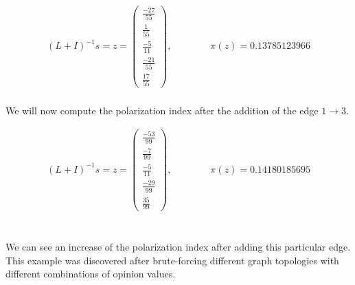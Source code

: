 \begin{equation}
	\begin{aligned}
		(L+I)^{-1}s=z=
		\left(\begin{matrix}
		\frac{-27}{55} \\
		\frac{1}{55} \\
		\frac{-5}{11} \\
		\frac{-21}{55} \\
		\frac{17}{55}
		\end{matrix}\right),
		\qquad \qquad
		\pi(z)= 0.13785123966
	\end{aligned}
\end{equation}
\\
We will now compute the polarization index after the addition of the edge $1\rightarrow3$.

\begin{equation}
	\begin{aligned}
		(L+I)^{-1}s=z=
		\left(\begin{matrix}
		\frac{-53}{99} \\
		\frac{-7}{99} \\
		\frac{-5}{11} \\
		\frac{-29}{99} \\
		\frac{35}{99}
		\end{matrix}\right),
		\qquad \qquad
		\pi(z) = 0.14180185695
	\end{aligned}
\end{equation}
\\
\\
We can see an increase of the polarization index after adding this particular edge. This example was discovered after brute-forcing different graph topologies with different combinations of opinion values.
\clearpage

